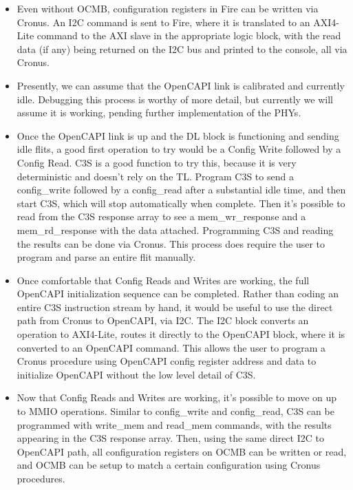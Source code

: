 \begin{itemize}

\item
Even without OCMB, configuration registers in Fire can be written via
Cronus. An I2C command is sent to Fire, where it is translated to an
AXI4-Lite command to the AXI slave in the appropriate logic block,
with the read data (if any) being returned on the I2C bus and printed
to the console, all via Cronus.

\item
Presently, we can assume that the OpenCAPI link is calibrated and
currently idle. Debugging this process is worthy of more detail, but
currently we will assume it is working, pending further implementation
of the PHYs.

\item
Once the OpenCAPI link is up and the DL block is functioning and
sending idle flits, a good first operation to try would be a Config
Write followed by a Config Read. C3S is a good function to try this,
because it is very deterministic and doesn't rely on the TL. Program
C3S to send a config\_write followed by a config\_read after a
substantial idle time, and then start C3S, which will stop
automatically when complete. Then it's possible to read from the C3S
response array to see a mem\_wr\_response and a mem\_rd\_response with
the data attached. Programming C3S and reading the results can be done
via Cronus. This process does require the user to program and parse an
entire flit manually.

\item
Once comfortable that Config Reads and Writes are working, the full
OpenCAPI initialization sequence can be completed. Rather than coding
an entire C3S instruction stream by hand, it would be useful to use
the direct path from Cronus to OpenCAPI, via I2C. The I2C block
converts an operation to AXI4-Lite, routes it directly to the OpenCAPI
block, where it is converted to an OpenCAPI command. This allows the
user to program a Cronus procedure using OpenCAPI config register
address and data to initialize OpenCAPI without the low level detail of C3S.

\item
Now that Config Reads and Writes are working, it's possible to move on
up to MMIO operations. Similar to config\_write and config\_read, C3S
can be programmed with write\_mem and read\_mem commands, with the
results appearing in the C3S response array. Then, using the same
direct I2C to OpenCAPI path, all configuration registers on OCMB can
be written or read, and OCMB can be setup to match a certain
configuration using Cronus procedures.


\end{itemize}
